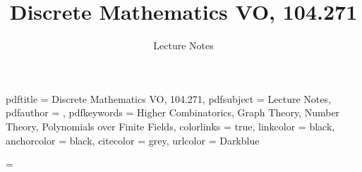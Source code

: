 
\usepackage[english]{babel}
\usepackage[utf8x]{inputenc}
\usepackage[T1]{fontenc}
\usepackage{calc}
\usepackage{lmodern}
\usepackage{pifont}
\usepackage[final]{graphicx}
\usepackage{subfigure}
\usepackage[intlimits]{mathtools}
\usepackage{amssymb}
\usepackage{booktabs}
\usepackage{float}
\usepackage{framed}
\usepackage{cleveref}
\usepackage{tabularx}
\usepackage{caption}
\usepackage{ragged2e}
\usepackage{soul}
\usepackage{theorem}
\usepackage{tikz}
\usepackage{makeidx}
\usepackage{paralist}
\usepackage[iso,german,english]{isodate}
\usepackage{placeins}
\usepackage[pdfborder={0 0 0}]{hyperref}
\usepackage[tikz]{bclogo}


\newcommand{\Title}{Discrete Mathematics VO, 104.271}
\newcommand{\Subject}{Lecture Notes}
\newcommand{\Keywords}{Higher Combinatorics, Graph Theory, Number Theory, Polynomials over Finite Fields}


\hypersetup
{
  pdftitle    = {\Title},
  pdfsubject  = {\Subject},
  pdfauthor   = {},
  pdfkeywords = {\Keywords},
  colorlinks  = true,
  linkcolor   = black,
  anchorcolor = black,
  citecolor   = grey,
  urlcolor    = Darkblue
}

\makeatletter

\captionsetup{format=hang,justification=justified,labelfont=bf,labelsep=colon,font=small}
\long{}

\author{}
\title{\Title}
\subtitle{\Subject}
\def\@thanks{%
  \vfill%
  \begin{bclogo}[logo=\bcinfo,barre=none,noborder=false]{~~Collaborate!}
    ~\\
    This document is edited collaboratively.
    We take notes during the lecture, and maintain them afterwards using Git.
    \textbf{Join us!}\\
    \href{http://www.informatik-forum.at/showthread.php?108733-Lecture-Notes}
    {http://www.informatik-forum.at/showthread.php?108733-Lecture-Notes}
  \end{bclogo}
}

\makeindex
\gdef\th@custom{%
  \th@plain%
  \def\@begintheorem##1##2{%
    \item[\hskip\labelsep \theorem@headerfont ##1\ ##2.]}}%
\theoremstyle{custom}
\theorembodyfont{\normalfont}
\newtheorem{definition}{Definition}

\def\thechapter{\Roman{chapter}}

\parindent=0pt
\parskip=\medskipamount

